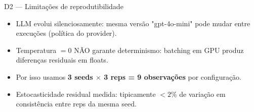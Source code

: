 \documentclass[aspectratio=169,10pt]{beamer}
\begin{document}
\begin{frame}{D2 --- Limita\c{c}\~oes de reprodutibilidade}
  \footnotesize
  \begin{itemize}
    \item LLM evolui silenciosamente: mesma vers\~ao "gpt-4o-mini" pode mudar entre execu\c{c}\~oes (pol\'itica do provider).
    \item Temperatura $= 0$ N\~AO garante determinismo: batching em GPU produz diferen\c{c}as residuais em floats.
    \item Por isso usamos \textbf{3 seeds $\times$ 3 reps = 9 observa\c{c}\~oes} por configura\c{c}\~ao.
    \item Estocasticidade residual medida: tipicamente $< 2\%$ de varia\c{c}\~ao em consist\^encia entre reps da mesma seed.
  \end{itemize}
\end{frame}
\end{document}
